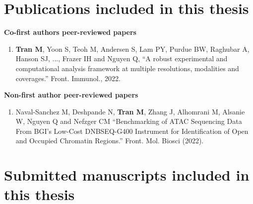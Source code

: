 


\section*{Publications included in this thesis}

\begin{instructional}
    \textbf{Co-first authors peer-reviewed papers}
	
	\begin{enumerate}
    \item \cite{tran2022robust} \textbf{Tran M}, Yoon S, Teoh M, Andersen S, Lam PY, Purdue BW, Raghubar A, Hanson SJ, ..., Frazer IH and Nguyen Q, ``A robust experimental and computational analysis framework at multiple resolutions, modalities and coverages.'' Front. Immunol., 2022.

    \end{enumerate}
    
    \textbf{Non-first author peer-reviewed papers}
    \begin{enumerate}
        \item \cite{naval2022benchmarking} Naval-Sanchez M, Deshpande N, \textbf{Tran M}, Zhang J, Alhomrani M, Alsanie W, Nguyen Q and Nefzger CM ``Benchmarking of ATAC Sequencing Data From BGI’s Low-Cost DNBSEQ-G400 Instrument for Identification of Open and Occupied Chromatin Regions.'' Front. Mol. Biosci (2022).
    \end{enumerate}
	
\end{instructional}





\section*{Submitted manuscripts included in this thesis}

